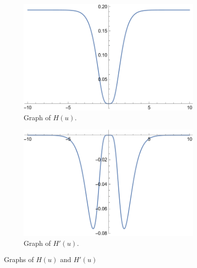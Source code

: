 \documentclass[12pt]{report}
\begin{document}
\begin{solution}
\begin{itemize}
        \begin{figure}[H]
            \begin{subfigure}[b]{0.5\linewidth}
                \centering
                \includegraphics[width=\linewidth]{images/5c1.png}
                \caption{Graph of $H(u)$.}
                \label{fig1:a}
                \vspace{4ex}
            \end{subfigure}%
            \begin{subfigure}[b]{0.5\linewidth}
                \centering
                \includegraphics[width=\linewidth]{images/5c2.png}
                \caption{Graph of $H'(u)$.}
                \label{fig1:b}
                \vspace{4ex}
            \end{subfigure}
            \caption{Graphs of $H(u)$ and $H'(u)$}
            \label{fig1}
        \end{figure}


\end{itemize}
\end{solution}
\end{document}
